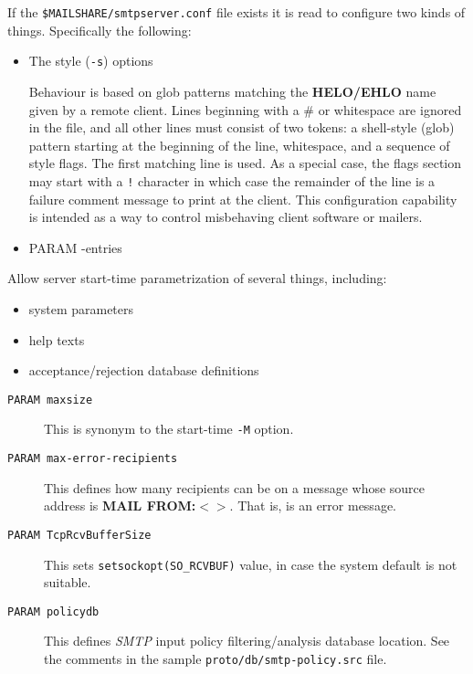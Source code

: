 If the {\tt \$MAILSHARE/smtpserver.conf} file exists it is read 
to configure two kinds of things. Specifically the following:

\begin{itemize}
\item The style ({\tt -s}) options

Behaviour is based on glob patterns matching the {\bf HELO/EHLO} name given by 
a remote client. Lines beginning with a \# or whitespace are ignored in the file, 
and all other lines must consist of two tokens: a shell-style (glob) pattern starting 
at the beginning of the line, whitespace, and a sequence of style flags. The first 
matching line is used. As a special case, the flags section may start with a {\tt !} 
character in which case the remainder of the line is a failure comment message to 
print at the client. This configuration capability is intended as a way to control 
misbehaving client software or mailers.
\end{itemize}


\begin{itemize}
\item PARAM -entries
\end{itemize}


Allow server start-time parametrization of several things, including:

\begin{itemize}
\item  system parameters
\item  help texts
\item  acceptance/rejection database definitions
\end{itemize}


\begin{description}
\item[{\tt PARAM maxsize}] \mbox{}

This is synonym to the start-time {\tt -M} option.

\item[{\tt PARAM max-error-recipients}] \mbox{}

This defines how many recipients can be on a 
message whose source address is {\bf MAIL FROM:{\(<\)}{\(>\)}}. That is, is an error message.

\item[{\tt PARAM TcpRcvBufferSize}] \mbox{}

This sets {\tt setsockopt(SO\_RCVBUF)} value, 
in case the system default is not suitable.

\item[{\tt PARAM policydb}] \mbox{}

This defines {\em SMTP\/} input policy filtering/analysis 
database location. See the comments in the sample {\tt proto/db/smtp-policy.src} file.

\end{description}


